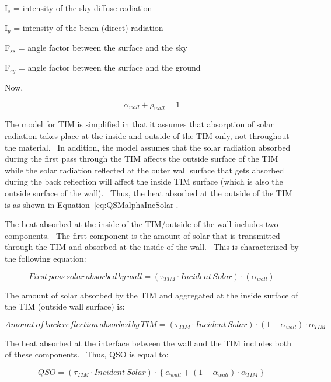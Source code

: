 I\(_{s}\) = intensity of the sky diffuse radiation

I\(_{g}\) = intensity of the beam (direct) radiation

F\(_{ss}\) = angle factor between the surface and the sky

F\(_{sg}\) = angle factor between the surface and the ground

Now,

\begin{equation}
{\alpha_{wall}} + {\rho_{wall}} = 1
\end{equation}

The model for TIM is simplified in that it assumes that absorption of solar radiation takes place at the inside and outside of the TIM only, not throughout the material.~ In addition, the model assumes that the solar radiation absorbed during the first pass through the TIM affects the outside surface of the TIM while the solar radiation reflected at the outer wall surface that gets absorbed during the back reflection will affect the inside TIM surface (which is also the outside surface of the wall).~ Thus, the heat absorbed at the outside of the TIM is as shown in Equation~\ref{eq:QSMalphaIncSolar}.

The heat absorbed at the inside of the TIM/outside of the wall includes two components.~ The first component is the amount of solar that is transmitted through the TIM and absorbed at the inside of the wall.~ This is characterized by the following equation:

\begin{equation}
First\,pass\,solar\,absorbed\,by\,wall = \left( {{\tau_{TIM}}\cdot Incident\,Solar} \right)\cdot \left( {{\alpha_{wall}}} \right)
\end{equation}

The amount of solar absorbed by the TIM and aggregated at the inside surface of the TIM (outside wall surface) is:

\begin{equation}
Amount\,of\,back\,reflection\,absorbed\,by\,TIM = \left( {{\tau_{TIM}}\cdot Incident\,Solar} \right)\cdot \left( {1 - {\alpha_{wall}}} \right)\cdot {\alpha_{TIM}}
\end{equation}

The heat absorbed at the interface between the wall and the TIM includes both of these components.~ Thus, QSO is equal to:

\begin{equation}
QSO = \left( {{\tau_{TIM}}\cdot Incident\,Solar} \right)\cdot \left\{ {{\alpha_{wall}} + \left( {1 - {\alpha_{wall}}} \right)\cdot \alpha {}_{TIM}} \right\}
\end{equation}

